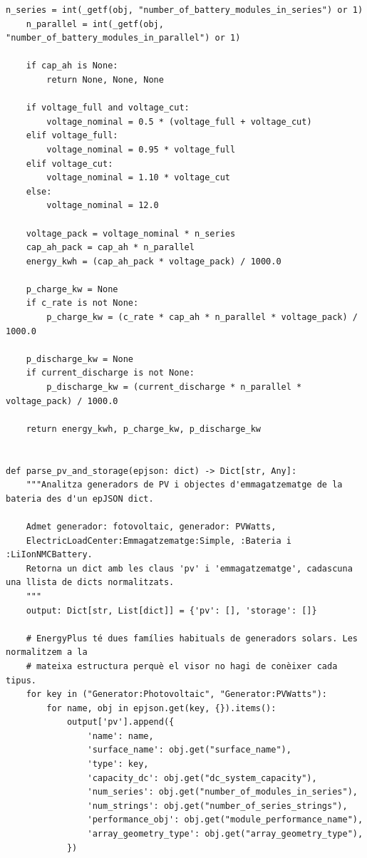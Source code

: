 \documentclass[10pt,a4paper]{article}
\begin{document}
\begin{lstlisting}[style=studioPython,caption={backend/mostrar\_entorn\_backend.py},label={lst:backend-mostrar-entorn-backend-py}]
    n_series = int(_getf(obj, "number_of_battery_modules_in_series") or 1)
    n_parallel = int(_getf(obj, "number_of_battery_modules_in_parallel") or 1)

    if cap_ah is None:
        return None, None, None

    if voltage_full and voltage_cut:
        voltage_nominal = 0.5 * (voltage_full + voltage_cut)
    elif voltage_full:
        voltage_nominal = 0.95 * voltage_full
    elif voltage_cut:
        voltage_nominal = 1.10 * voltage_cut
    else:
        voltage_nominal = 12.0

    voltage_pack = voltage_nominal * n_series
    cap_ah_pack = cap_ah * n_parallel
    energy_kwh = (cap_ah_pack * voltage_pack) / 1000.0

    p_charge_kw = None
    if c_rate is not None:
        p_charge_kw = (c_rate * cap_ah * n_parallel * voltage_pack) / 1000.0

    p_discharge_kw = None
    if current_discharge is not None:
        p_discharge_kw = (current_discharge * n_parallel * voltage_pack) / 1000.0

    return energy_kwh, p_charge_kw, p_discharge_kw


def parse_pv_and_storage(epjson: dict) -> Dict[str, Any]:
    """Analitza generadors de PV i objectes d'emmagatzematge de la bateria des d'un epJSON dict.

    Admet generador: fotovoltaic, generador: PVWatts,
    ElectricLoadCenter:Emmagatzematge:Simple, :Bateria i :LiIonNMCBattery.
    Retorna un dict amb les claus 'pv' i 'emmagatzematge', cadascuna una llista de dicts normalitzats.
    """
    output: Dict[str, List[dict]] = {'pv': [], 'storage': []}

    # EnergyPlus té dues famílies habituals de generadors solars. Les normalitzem a la
    # mateixa estructura perquè el visor no hagi de conèixer cada tipus.
    for key in ("Generator:Photovoltaic", "Generator:PVWatts"):
        for name, obj in epjson.get(key, {}).items():
            output['pv'].append({
                'name': name,
                'surface_name': obj.get("surface_name"),
                'type': key,
                'capacity_dc': obj.get("dc_system_capacity"),
                'num_series': obj.get("number_of_modules_in_series"),
                'num_strings': obj.get("number_of_series_strings"),
                'performance_obj': obj.get("module_performance_name"),
                'array_geometry_type': obj.get("array_geometry_type"),
            })


\end{lstlisting}
\end{document}
